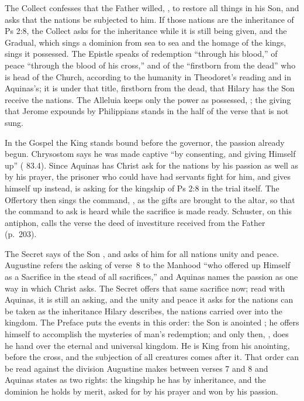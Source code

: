 The Collect confesses that the Father willed, , to restore all
things in his Son, and asks that the nations be subjected to him. If those
nations are the inheritance of Ps 2:8, the Collect asks for the inheritance
while it is still being given, and the Gradual, which sings a dominion from sea
to sea and the homage of the kings, sings it possessed. The Epistle speaks of
redemption ``through his blood,'' of peace ``through the blood of his cross,''
and of the ``firstborn from the dead'' who is head of the Church, according to
the humanity in Theodoret's reading and  in
Aquinas's; it is under that title, firstborn from the dead, that Hilary has the
Son receive the nations. The Alleluia keeps only the power as possessed,
; the giving that Jerome expounds by Philippians stands
in the half of the verse that is not sung.

In the Gospel the King stands bound before the governor, the passion already
begun. Chrysostom says he was made captive ``by consenting, and giving Himself
up'' ( 83.4). Since Aquinas has Christ ask for the
nations by his passion as well as by his prayer, the prisoner who could have
had servants fight for him, and gives himself up instead, is asking for the
kingship of Ps 2:8 in the trial itself. The Offertory then sings the command,
, as the gifts are brought to the altar, so that the
command to ask is heard while the sacrifice is made ready. Schuster, on this
antiphon, calls the verse the deed of investiture received from the Father
(p.~203).

The Secret says  of
the Son , and asks of him for
all nations unity and peace. Augustine refers the asking of verse~8 to the
Manhood ``who offered up Himself as a Sacrifice in the stead of all
sacrifices,'' and Aquinas names the passion as one way in which Christ asks.
The Secret offers that same sacrifice now; read with Aquinas, it is still an
asking, and the unity and peace it asks for the nations can be taken as the
inheritance Hilary describes, the nations carried over into the kingdom. The
Preface puts the events in this order: the Son is anointed ; he offers himself  to
accomplish the mysteries of man's redemption; and only then, , does he hand over the eternal and
universal kingdom. He is King from his anointing, before the cross, and the
subjection of all creatures comes after it. That order can be read against
the division Augustine makes between verses 7 and 8 and Aquinas states as two
rights: the kingship he has by inheritance, and the dominion he holds by
merit, asked for by his prayer and won by his passion.

